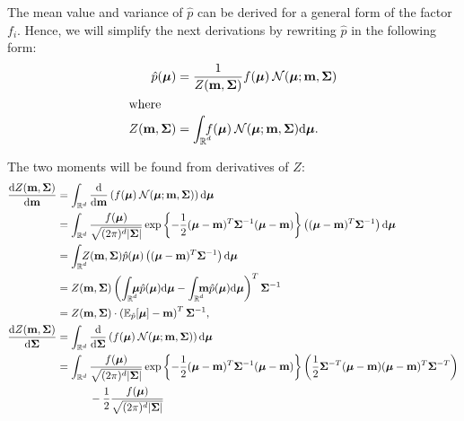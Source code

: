 \documentclass[11pt]{article}
\newcommand{\vek}[1]{\ensuremath{\mathbf{#1}}}
\newcommand{\byd}{\ensuremath{\mathrm{d}}}
\newcommand{\norm}{\ensuremath{\:\mathcal{N}}}
\newcommand{\ee}{\ensuremath{\mathbb{E}}}
\newcommand{\real}{\ensuremath{\mathbb{R}}}
\newcommand{\intr}{\ensuremath{\int_{\real^d}}}
\newcommand{\intrc}{\ensuremath{\int_{\rlap{\scriptsize$\real^d$}}\:}}
\begin{document}
The mean value and variance of $\hat{p}$ can be derived for a general form
of the factor $f_i$. Hence, we will simplify the next derivations by 
rewriting $\hat{p}$ in the following form:
\begin{align}
	\hat{p}(\boldsymbol{\mu}) &= \frac{1}{Z(\vek{m}, \vek{\Sigma})}f(\boldsymbol{\mu})\norm(\boldsymbol{\mu}; \vek{m}, 
\vek{\Sigma})\\
\intertext{where}
	Z(\vek{m}, \vek{\Sigma}) &= \intrc f(\boldsymbol{\mu})\norm(\boldsymbol{\mu}; \vek{m}, 
\vek{\Sigma})\byd \boldsymbol{\mu}.
\end{align}

The two moments will be found from derivatives of $Z$:
\begin{align}
	\frac{\byd Z(\vek{m}, \vek{\Sigma})}{\byd \vek{m}} %
		&= \intr\frac{\byd}{\byd \vek{m}}\left(f(\boldsymbol{\mu})\norm(\boldsymbol{\mu}; 
			\vek{m}, \vek{\Sigma})\right)\byd\boldsymbol{\mu}\\
		&= \intr\frac{f(\boldsymbol{\mu})}{\sqrt{(2\pi)^d |\vek{\Sigma}|}}%
						\exp\left\{-\frac{1}{2}(\boldsymbol{\mu} - \vek{m})^T\vek{\Sigma}^{-1}(\boldsymbol{\mu} 
						- \vek{m})\right\}%
						\left((\boldsymbol{\mu} - \vek{m})^T\vek{\Sigma}^{-1}\right) \byd \boldsymbol{\mu}\\
		&= \intrc Z(\vek{m}, \vek{\Sigma}) \hat{p}(\boldsymbol{\mu})\left((\boldsymbol{\mu} 
		- \vek{m})^T\vek{\Sigma}^{-1}\right) \byd \boldsymbol{\mu}\\
		&= Z(\vek{m}, \vek{\Sigma})\left(
					\intrc\boldsymbol{\mu}    \hat{p}(\boldsymbol{\mu}) \byd \boldsymbol{\mu} %
				-	\intrc\vek{m}\hat{p}(\boldsymbol{\mu}) \byd 
		\boldsymbol{\mu}\right)^T\vek{\Sigma}^{-1}\\
		&= Z(\vek{m}, \vek{\Sigma})\cdot\left(\ee_{\hat{p}}[\boldsymbol{\mu}] 
		- \vek{m}\right)^T\vek{\Sigma}^{-1},
		\label{eq:z_by_m}
		\\
	\frac{\byd Z(\vek{m}, \vek{\Sigma})}{\byd \vek{\Sigma}} %
		&= \intr\frac{\byd}{\byd \vek{\Sigma}}\left(f(\boldsymbol{\mu})\norm(\boldsymbol{\mu}; 
			\vek{m}, \vek{\Sigma})\right) \byd\boldsymbol{\mu} \\
		&= \intr\frac{f(\boldsymbol{\mu})}{\sqrt{(2\pi)^d|\vek{\Sigma}|}}%
						\exp\left\{-\frac{1}{2}(\boldsymbol{\mu} - \vek{m})^T\vek{\Sigma}^{-1}(\boldsymbol{\mu} 
						- \vek{m})\right\}%
						\left(\frac{1}{2}\vek{\Sigma}^{-T}(\boldsymbol{\mu} - \vek{m})(\boldsymbol{\mu} 
				- \vek{m})^T\vek{\Sigma}^{-T}\right)
				\notag\\
		&\hphantom{=\intr|}
					- \frac{1}{2}\frac{f(\boldsymbol{\mu})}{\sqrt{(2\pi)^{d}|\vek{\Sigma}|}}

\end{align}
\end{document}
